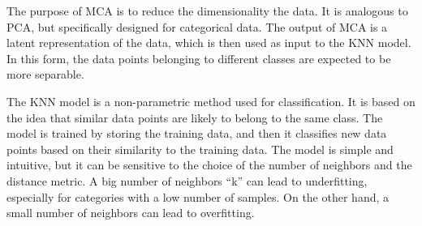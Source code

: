 \documentclass[
]{article}
\begin{document}
The purpose of MCA is to reduce the dimensionality the data. It is
analogous to PCA, but specifically designed for categorical data. The
output of MCA is a latent representation of the data, which is then used
as input to the KNN model. In this form, the data points belonging to
different classes are expected to be more separable.

The KNN model is a non-parametric method used for classification. It is
based on the idea that similar data points are likely to belong to the
same class. The model is trained by storing the training data, and then
it classifies new data points based on their similarity to the training
data. The model is simple and intuitive, but it can be sensitive to the
choice of the number of neighbors and the distance metric. A big number
of neighbors ``k'' can lead to underfitting, especially for categories
with a low number of samples. On the other hand, a small number of
neighbors can lead to overfitting.
\end{document}
